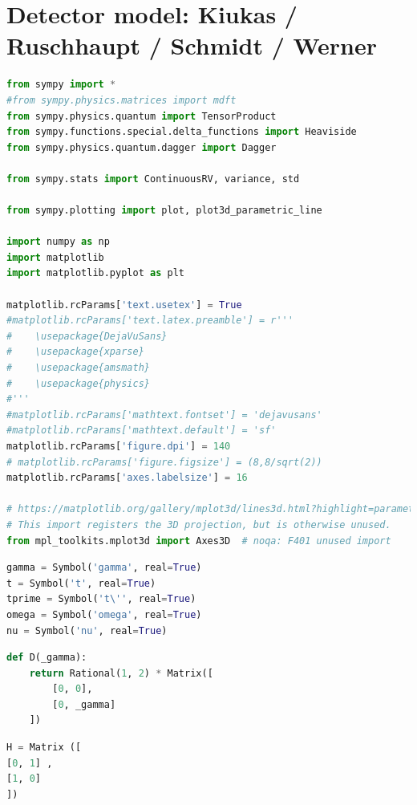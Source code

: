 \graphicspath{{tex/appendix/nb/jupyter/detect/}}

\hypertarget{detector-model-kiukas-ruschhaupt-schmidt-werner}{%
\section{Detector model: Kiukas / Ruschhaupt / Schmidt /
Werner}\label{detector-model-kiukas-ruschhaupt-schmidt-werner}}

\begin{lstlisting}[language=Python]
from sympy import *
#from sympy.physics.matrices import mdft
from sympy.physics.quantum import TensorProduct
from sympy.functions.special.delta_functions import Heaviside
from sympy.physics.quantum.dagger import Dagger

from sympy.stats import ContinuousRV, variance, std

from sympy.plotting import plot, plot3d_parametric_line

import numpy as np
import matplotlib
import matplotlib.pyplot as plt

matplotlib.rcParams['text.usetex'] = True
#matplotlib.rcParams['text.latex.preamble'] = r'''
#    \usepackage{DejaVuSans}
#    \usepackage{xparse}
#    \usepackage{amsmath}
#    \usepackage{physics}
#'''
#matplotlib.rcParams['mathtext.fontset'] = 'dejavusans' 
#matplotlib.rcParams['mathtext.default'] = 'sf'
matplotlib.rcParams['figure.dpi'] = 140
# matplotlib.rcParams['figure.figsize'] = (8,8/sqrt(2))
matplotlib.rcParams['axes.labelsize'] = 16

# https://matplotlib.org/gallery/mplot3d/lines3d.html?highlight=parametric
# This import registers the 3D projection, but is otherwise unused.
from mpl_toolkits.mplot3d import Axes3D  # noqa: F401 unused import
\end{lstlisting}

\begin{lstlisting}[language=Python]
gamma = Symbol('gamma', real=True)
t = Symbol('t', real=True)
tprime = Symbol('t\'', real=True)
omega = Symbol('omega', real=True)
nu = Symbol('nu', real=True)
\end{lstlisting}

\begin{lstlisting}[language=Python]
def D(_gamma):
    return Rational(1, 2) * Matrix([
        [0, 0],
        [0, _gamma]
    ])
\end{lstlisting}

\begin{lstlisting}[language=Python]
H = Matrix ([
[0, 1] ,
[1, 0]
])
\end{lstlisting}

